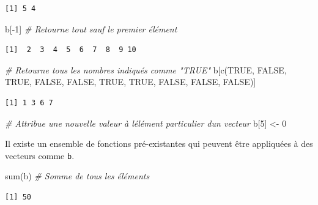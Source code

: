\documentclass[
  12pt,
]{book}
\newenvironment{Shaded}{\begin{snugshade}}{\end{snugshade}}
\newcommand{\CommentTok}[1]{\textcolor[rgb]{0.56,0.35,0.01}{\textit{#1}}}
\newcommand{\ConstantTok}[1]{\textcolor[rgb]{0.00,0.00,0.00}{#1}}
\newcommand{\DecValTok}[1]{\textcolor[rgb]{0.00,0.00,0.81}{#1}}
\newcommand{\FunctionTok}[1]{\textcolor[rgb]{0.00,0.00,0.00}{#1}}
\newcommand{\NormalTok}[1]{#1}
\newcommand{\OtherTok}[1]{\textcolor[rgb]{0.56,0.35,0.01}{#1}}
\newcommand{\SpecialCharTok}[1]{\textcolor[rgb]{0.00,0.00,0.00}{#1}}
\begin{document}
\begin{verbatim}
[1] 5 4
\end{verbatim}

\begin{Shaded}
\begin{Highlighting}[]
\NormalTok{b[}\SpecialCharTok{{-}}\DecValTok{1}\NormalTok{] }\CommentTok{\# Retourne tout sauf le premier élément}
\end{Highlighting}
\end{Shaded}

\begin{verbatim}
[1]  2  3  4  5  6  7  8  9 10
\end{verbatim}

\begin{Shaded}
\begin{Highlighting}[]
\CommentTok{\# Retourne tous les nombres indiqués comme "TRUE"}
\NormalTok{b[}\FunctionTok{c}\NormalTok{(}\ConstantTok{TRUE}\NormalTok{, }\ConstantTok{FALSE}\NormalTok{, }\ConstantTok{TRUE}\NormalTok{, }\ConstantTok{FALSE}\NormalTok{, }\ConstantTok{FALSE}\NormalTok{, }\ConstantTok{TRUE}\NormalTok{, }\ConstantTok{TRUE}\NormalTok{, }\ConstantTok{FALSE}\NormalTok{, }\ConstantTok{FALSE}\NormalTok{, }\ConstantTok{FALSE}\NormalTok{)]}
\end{Highlighting}
\end{Shaded}

\begin{verbatim}
[1] 1 3 6 7
\end{verbatim}

\begin{Shaded}
\begin{Highlighting}[]
\CommentTok{\# Attribue une nouvelle valeur à l\textquotesingle{}élément particulier d\textquotesingle{}un vecteur}
\NormalTok{b[}\DecValTok{5}\NormalTok{] }\OtherTok{\textless{}{-}} \DecValTok{0}
\end{Highlighting}
\end{Shaded}

Il existe un ensemble de fonctions pré-existantes qui peuvent être appliquées à des vecteurs comme \texttt{b}.

\begin{Shaded}
\begin{Highlighting}[]
\FunctionTok{sum}\NormalTok{(b) }\CommentTok{\# Somme de tous les éléments}
\end{Highlighting}
\end{Shaded}

\begin{verbatim}
[1] 50
\end{verbatim}
\end{document}
